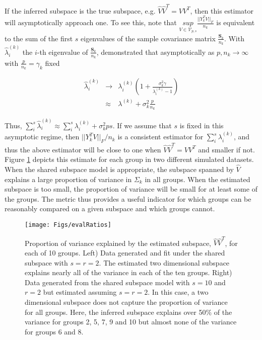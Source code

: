 \documentclass{article}
\newcommand{\bl}[1]{{\mathbf #1}}
\begin{document}
If the inferred subspace is the true subspace, e.g. $\hat{V}\hat{V}^T = VV^T$,
then this estimator will asymptotically approach one.  To see this, note that
$\underset{V \in \mathcal{V}_{p, s}}{sup}\frac{||Y_k^TV||_F}{n_k}$ is
equivalent to the sum of the first $s$ eigenvalues of the sample
covariance matrix $\frac{\bl S_k}{n_k}$.  With $\hat{\lambda}^{(k)}_i$
the $i$-th eigenvalue of $\frac{\bl S_k}{n_k}$, \citet{Baik2006}
demonstrated that asymptotically as $p, n_k \rightarrow \infty$ with
$\frac{p}{n_k} = \gamma_k$ fixed

\begin{eqnarray}
\hat{\lambda}^{(k)}_i &\rightarrow& \lambda^{(k)}_i\left(1 +
                                    \frac{\sigma_k^2\gamma}{\lambda^{(k)}_i
                                    - 1}\right)\\
& \approx& \lambda^{(k)} + \sigma^2_k\frac{p}{n_k}
\end{eqnarray}

Thus,
$\sum_i^s \hat{\lambda}^{(k)}_i \approx \sum_i^s \lambda^{(k)}_i +
\sigma_k^2ps$.
If we assume that $s$ is fixed in this asymptotic regime, then
$||Y_k^TV||_F/n_k$ is a consistent estimator for
$\sum_i^s \lambda^{(k)}_i$, and thus the above estimator will be close
to one when $\hat{V}\hat{V}^T = VV^T$ and smaller if not.  Figure
\ref{fig:evalRatios} depicts this estimate for each group in two
different simulated datasets.  When the shared subspace model is
appropriate, the subspace spanned by $\hat{V}$ explains a large
proportion of variance in $\Sigma_k$ in all groups.  When the
estimated subspace is too small, the proportion of variance will be
small for at least some of the groups.  The metric thus provides a
useful indicator for which groups can be reasonably compared on a
given subspace and which groups cannot.

\begin{figure}[!ht]
  \centering
    \texttt{[image: Figs/evalRatios]}
    \caption{Proportion of variance explained by the estimated
      subspace, $\hat{V}\hat{V}^T$, for each of 10 groups.  Left) Data
      generated and fit under the shared subspace with $s=r=2$.  The
      estimated two dimensional subspace explains nearly all of the
      variance in each of the ten groups.  Right) Data generated from
      the shared subspace model with $s=10$ and $r=2$ but estimated
      assuming $s=r=2$.  In this case, a two dimensional subspace does
      not capture the proportion of variance for all groups.  Here,
      the inferred subspace explains over 50\% of the variance for
      groups 2, 5, 7, 9 and 10 but almost none of the variance for
      groups 6 and 8. }
\label{fig:evalRatios}
\end{figure}
\end{document}

